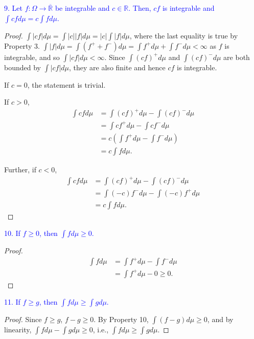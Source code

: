 \documentclass[12pt]{extarticle}
\newcommand{\R}{\overline{\mathbb{R}}}
\begin{document}
\textcolor{blue}{9. Let $f: \Omega \to \R$ be integrable and $c \in \mathbb{R}$. Then, $cf$ is integrable and $\int cf d\mu = c\int fd\mu$.}
\begin{proof}
    $\int |cf| d\mu = \int |c||f| d\mu = |c| \int |f| d\mu $, where the last equality is true by Property 3. $\int |f| d\mu = \int (f^+ + f^-) d\mu = \int f^+ d\mu + \int f^- d\mu < \infty$ as $f$ is integrable, and so $\int |cf| d\mu < \infty$. Since $\int (cf)^+ d\mu$ and $\int (cf)^- d\mu$ are both bounded by $\int |cf| d\mu$, they are also finite and hence $cf$ is integrable.

    If $c = 0$, the statement is trivial. 

    If $c > 0$, 
    \begin{align*}
        \int cf d\mu &= \int(cf)^+  d\mu - \int (cf)^- d\mu \\
        &= \int cf^+ d\mu - \int cf^- d\mu \\
        &= c \left( \int f^+ d\mu - \int f^- d\mu \right) \\
        &= c \int f d\mu.
    \end{align*}

    Further, if $c < 0$, 
    \begin{align*}
        \int cf d\mu &= \int(cf)^+  d\mu - \int (cf)^- d\mu \\
        &= \int (-c) f^- d\mu - \int (-c)f^+ d\mu \\
        &= c \int f d\mu.
    \end{align*} 
\end{proof}

\textcolor{blue}{10. If $f \geq 0$, then $\int f d\mu \geq 0$.}
\begin{proof}
    \begin{align*}
        \int f d\mu &= \int f^+ d\mu - \int f^- d\mu \\
        &= \int f^+ d\mu - 0 \geq 0.
    \end{align*}
\end{proof}

\textcolor{blue}{11. If $f \geq g$, then $\int f d\mu \geq \int g d\mu$.}
\begin{proof}
    Since $f \geq g$, $f-g \geq 0$. By Property 10, $\int (f - g) d\mu \geq 0$, and by linearity, $\int f d\mu - \int gd\mu \geq 0$, i.e., $\int f d\mu \geq \int g d\mu$.
\end{proof}
\end{document}
